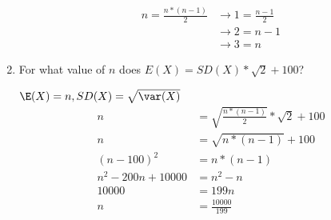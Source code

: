 \begin{enumerate}[label=(\alph*)]
\begin{solution}[3cm]
\begin{equation}
\begin{split}
n = \frac{n*(n-1)}{2} &\rightarrow 1 = \frac{n-1}{2} \\ \nonumber
&\rightarrow 2 = n - 1 \\
&\rightarrow 3 = n
\end{split}
\end{equation}
\end{solution}

\item For what value of $n$ does $E(X) = SD(X)*\sqrt{2} + 100$?
\begin{solution}[2 cm]
$\E(X) = n, SD(X) = \sqrt{\var(X)}$
\begin{equation}
\begin{split}
n &= \sqrt{\frac{n*(n-1)}{2}}*\sqrt{2} + 100 \\ \nonumber
n &= \sqrt{n*(n-1)} + 100 \\
(n - 100)^2 &= n*(n-1) \\
n^2 - 200n + 10000 &= n^2 - n \\
10000 &= 199n \\
n &= \frac{10000}{199}
\end{split}
\end{equation}
\end{solution}

\end{enumerate}